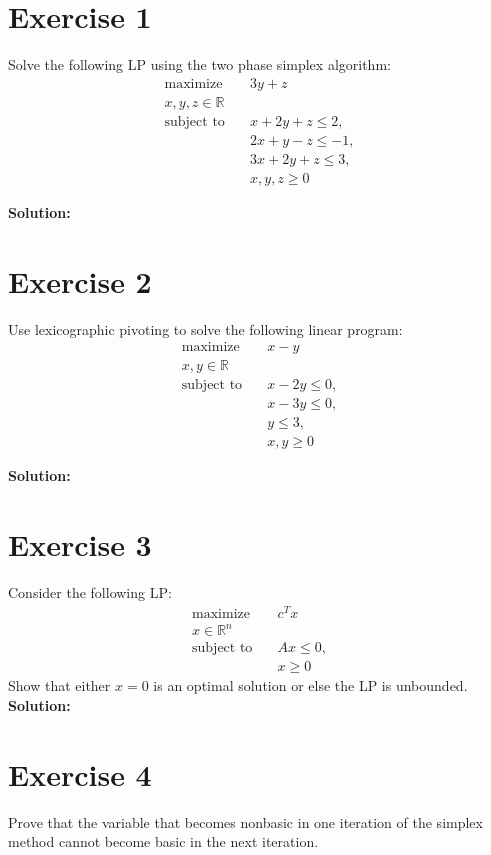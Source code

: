 \documentclass{article}
\begin{document}
\section*{Exercise 1}
Solve the following LP using the two phase simplex algorithm:
\begin{align*}
\text{maximize} \quad & 3y + z \\
x, y, z \in \mathbb{R} & \\
\text{subject to} \quad & x + 2y + z \leq 2, \\
& 2x + y - z \leq -1, \\
& 3x + 2y + z \leq 3, \\
& x, y, z \geq 0
\end{align*}

\textbf{Solution:} \\

\newpage

\section*{Exercise 2}
Use lexicographic pivoting to solve the following linear program:
\begin{align*}
\text{maximize} \quad & x - y \\
x, y \in \mathbb{R} & \\
\text{subject to} \quad & x - 2y \leq 0, \\
& x - 3y \leq 0, \\
& y \leq 3, \\
& x, y \geq 0
\end{align*}

\textbf{Solution:}

\newpage

\section*{Exercise 3}
Consider the following LP:
\begin{align*}
\text{maximize} \quad & c^T x \\
x \in \mathbb{R}^n & \\
\text{subject to} \quad & Ax \leq 0, \\
& x \geq 0
\end{align*}
Show that either $x = 0$ is an optimal solution or else the LP is unbounded. \\

\textbf{Solution:}

\newpage

\section*{Exercise 4}
Prove that the variable that becomes nonbasic in one iteration of the simplex method cannot become basic in the next iteration. \\
\end{document}
